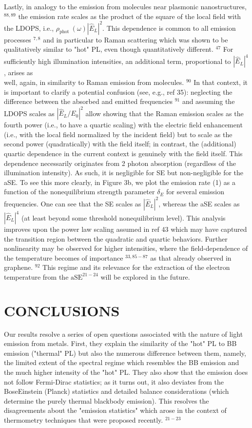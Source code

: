 \documentclass[10pt]{article}
\begin{document}
Lastly, in analogy to the emission from molecules near plasmonic nanostructures, ${ }^{88,89}$ the emission rate scales as the product of the square of the local field with the LDOPS, i.e., $\rho_{\text {phot }}(\omega)\left|\hat{E}_{L}\right|^{2}$. This dependence is common to all emission processes ${ }^{7,8}$ and in particular to Raman scattering which was shown to be qualitatively similar to "hot" PL, even though quantitatively different. ${ }^{47}$ For sufficiently high illumination intensities, an additional term, proportional to $\left|\hat{E}_{L}\right|^{4}$, arises as\\
well, again, in similarity to Raman emission from molecules. ${ }^{90}$ In that context, it is important to clarify a potential confusion (see, e.g., ref 35): neglecting the difference between the absorbed and emitted frequencies ${ }^{91}$ and assuming the LDOPS scales as $\left|\hat{E}_{L} / E_{0}\right|^{2}$ allow showing that the Raman emission scales as the fourth power (i.e., to have a quartic scaling) with the electric field enhancement (i.e., with the local field normalized by the incident field) but to scale as the second power (quadratically) with the field itself; in contrast, the (additional) quartic dependence in the current context is genuinely with the field itself. This dependence necessarily originates from 2 photon absorption (regardless of the illumination intensity). As such, it is negligible for SE but non-negligible for the aSE. To see this more clearly, in Figure 3b, we plot the emission rate (1) as a function of the nonequilibrium strength parameter $\delta_{E}$ for several emission frequencies. One can see that the SE scales as $\left|\hat{E}_{L}\right|^{2}$, whereas the aSE scales as $\left|\hat{E}_{L}\right|^{4}$ (at least beyond some threshold nonequilibrium level). This analysis improves upon the power law scaling assumed in ref 43 which may have captured the transition region between the quadratic and quartic behaviors. Further nonlinearity may be observed for higher intensities, where the field-dependence of the temperature becomes of importance ${ }^{33,85-87}$ as that already observed in graphene. ${ }^{92}$ This regime and its relevance for the extraction of the electron temperature from the $\mathrm{aSE}^{21-24}$ will be explored in the future.

\section*{CONCLUSIONS}
Our results resolve a series of open questions associated with the nature of light emission from metals. First, they explain the similarity of the "hot" PL to BB emission ("thermal" PL) but also the numerous difference between them, namely, the limited extent of the spectral regime which resembles the BB emission and the much higher intensity of the "hot" PL. They also show that the emission does not follow Fermi-Dirac statistics; as it turns out, it also deviates from the BoseEinstein (Planck) statistics and detailed balance considerations (which determine the purely thermal blackbody emission). This resolves the disagreements about the "emission statistics" which arose in the context of thermometry techniques that were proposed recently. ${ }^{21-23}$
\end{document}
